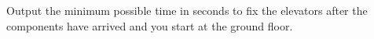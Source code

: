 
    Output the minimum possible time in seconds to fix the elevators after the components have arrived and you start at the ground floor.
